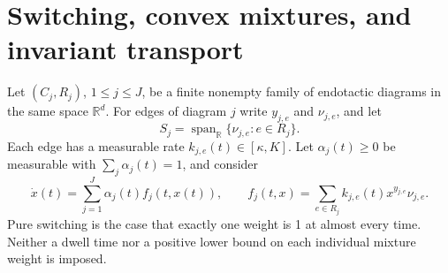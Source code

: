 \documentclass[11pt]{article}
\theoremstyle{definition}
\theoremstyle{remark}
\newcommand{\R}{\mathbb R}
\DeclareMathOperator{\spanR}{span}
\numberwithin{equation}{section}
\begin{document}
\section{Switching, convex mixtures, and invariant transport}
\label{sec:switching}

Let $(C_j,R_j)$, $1\leq j\leq J$, be a finite nonempty family
of endotactic diagrams in the same space $\R^d$. For edges
of diagram $j$ write $y_{j,e}$ and $\nu_{j,e}$, and let
\[
 S_j=\spanR_{\R}\{\nu_{j,e}:e\in R_j\}.
\]
Each edge has a measurable rate $k_{j,e}(t)\in[\kappa,K]$.
Let $\alpha_j(t)\geq0$ be measurable with
$\sum_j\alpha_j(t)=1$, and consider
\begin{equation}
 \dot x(t)=\sum_{j=1}^J\alpha_j(t)f_j(t,x(t)),\qquad
 f_j(t,x)=\sum_{e\in R_j}k_{j,e}(t)x^{y_{j,e}}\nu_{j,e}.
 \label{eq:mixture}
\end{equation}
Pure switching is the case that exactly one weight is 1 at
almost every time. Neither a dwell time nor a positive lower
bound on each individual mixture weight is imposed.
\end{document}

